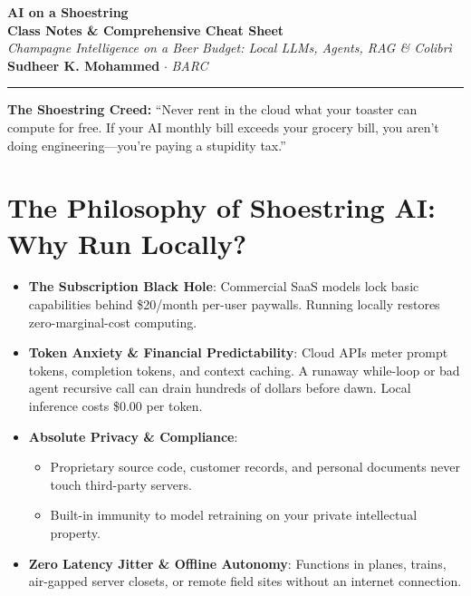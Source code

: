 \documentclass[11pt,a4paper]{article}
\begin{document}
\begin{center}
    {\Huge \textbf{\color{ShoeNavy}AI on a Shoestring}}\\[4pt]
    {\large \textbf{\color{ShoeCoral}Class Notes \& Comprehensive Cheat Sheet}}\\[3pt]
    \textit{Champagne Intelligence on a Beer Budget: Local LLMs, Agents, RAG \& Colibr\`i}\\[4pt]
    \textbf{Sudheer K. Mohammed} $\cdot$ \textit{BARC}\\[2pt]
    \rule{0.6\textwidth}{0.6pt}
\end{center}

\vspace{0.2cm}
\begin{tcolorbox}[colback=ShoeNavy!5, colframe=ShoeNavy, arc=2mm, boxrule=0.8pt]
    \centering
    \textbf{The Shoestring Creed:} ``Never rent in the cloud what your toaster can compute for free. If your AI monthly bill exceeds your grocery bill, you aren't doing engineering---you're paying a stupidity tax.''
\end{tcolorbox}

\vspace{0.3cm}

\section{The Philosophy of Shoestring AI: Why Run Locally?}
\begin{itemize}
    \item \textbf{The Subscription Black Hole}: Commercial SaaS models lock basic capabilities behind \$20/month per-user paywalls. Running locally restores zero-marginal-cost computing.
    \item \textbf{Token Anxiety \& Financial Predictability}: Cloud APIs meter prompt tokens, completion tokens, and context caching. A runaway while-loop or bad agent recursive call can drain hundreds of dollars before dawn. Local inference costs \$0.00 per token.
    \item \textbf{Absolute Privacy \& Compliance}:
    \begin{itemize}
        \item Proprietary source code, customer records, and personal documents never touch third-party servers.
        \item Built-in immunity to model retraining on your private intellectual property.
    \end{itemize}
    \item \textbf{Zero Latency Jitter \& Offline Autonomy}: Functions in planes, trains, air-gapped server closets, or remote field sites without an internet connection.
\end{itemize}
\end{document}
